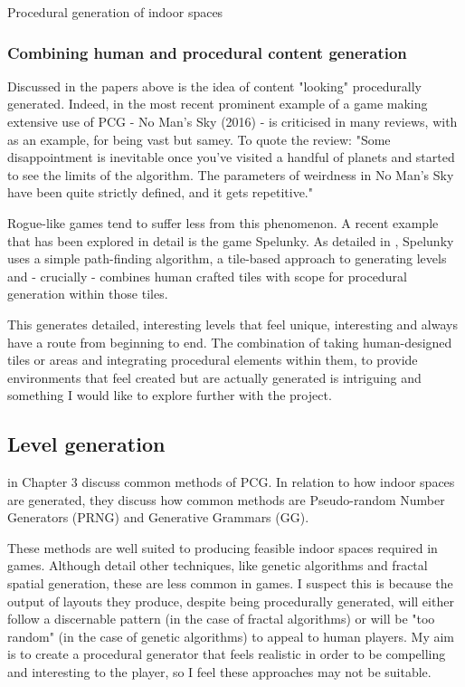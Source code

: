 \documentclass[review]{cmpreport}
\begin{document}
\begin{section}{Procedural generation of indoor spaces}
\subsubsection{Combining human and procedural content generation}
Discussed in the papers above is the idea of content "looking" procedurally generated. Indeed, in the most recent prominent example of a game making extensive use of PCG - No Man's Sky (2016) - is criticised in many reviews, with \cite{welsh_2016} as an example, for being vast but samey. To quote the review: "Some disappointment is inevitable once you've visited a handful of planets and started to see the limits of the algorithm. The parameters of weirdness in No Man's Sky have been quite strictly defined, and it gets repetitive." \par
Rogue-like games tend to suffer less from this phenomenon. A recent example that has been explored in detail is the game Spelunky. As detailed in \cite{gct-spelunky}, Spelunky uses a simple path-finding algorithm, a tile-based approach to generating levels and - crucially - combines human crafted tiles with scope for procedural generation within those tiles. \par
This generates detailed, interesting levels that feel unique, interesting and always have a route from beginning to end. The combination of taking human-designed tiles or areas and integrating procedural elements within them, to provide environments that feel created but are actually generated is intriguing and something I would like to explore further with the project.

\section{Level generation}
\cite{Hendrikx:2013:PCG:2422956.2422957} in Chapter 3 discuss common methods of PCG. In relation to how indoor spaces are generated, they discuss how common methods are Pseudo-random Number Generators (PRNG) and Generative Grammars (GG). \par
These methods are well suited to producing feasible indoor spaces required in games. Although \cite{Hendrikx:2013:PCG:2422956.2422957} detail other techniques, like genetic algorithms and fractal spatial generation, these are less common in games. I suspect this is because the output of layouts they produce, despite being procedurally generated, will either follow a discernable pattern (in the case of fractal algorithms) or will be "too random" (in the case of genetic algorithms) to appeal to human players. My aim is to create a procedural generator that feels realistic in order to be compelling and interesting to the player, so I feel these approaches may not be suitable.


\end{section}
\end{document}
